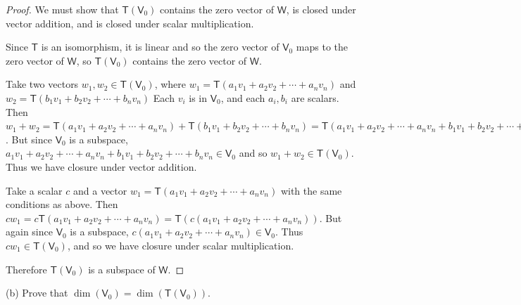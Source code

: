 \documentclass[11pt]{article}
\begin{document}
\begin{proof}
    We must show that $\mathsf{T}(\mathsf{V}_0)$ contains the zero vector of $\mathsf{W}$, is closed under vector addition, and is closed under scalar multiplication. 

    Since $\mathsf{T}$ is an isomorphism, it is linear and so the zero vector of $\mathsf{V}_0$ maps to the zero vector of $\mathsf{W}$, so $\mathsf{T}(\mathsf{V}_0)$ contains the zero vector of $\mathsf{W}$.

    Take two vectors $w_1,w_2\in \mathsf{T}(\mathsf{V}_0)$, where $w_1 = \mathsf{T}(a_1v_1+a_2v_2+\cdots + a_nv_n)$ and $w_2 = \mathsf{T}(b_1v_1+b_2v_2+\cdots + b_nv_n)$ Each $v_i$ is in $\mathsf{V}_0$, and each $a_i,b_i$ are scalars. Then $w_1+w_2 = \mathsf{T}(a_1v_1+a_2v_2+\cdots + a_nv_n) + \mathsf{T}(b_1v_1+b_2v_2+\cdots + b_nv_n) = \mathsf{T}(a_1v_1+a_2v_2+\cdots + a_nv_n + b_1v_1+b_2v_2+\cdots + b_nv_n)$. But since $\mathsf{V}_0$ is a subspace, $a_1v_1+a_2v_2+\cdots + a_nv_n + b_1v_1+b_2v_2+\cdots + b_nv_n \in \mathsf{V}_0$ and so $w_1+w_2 \in \mathsf{T}(\mathsf{V}_0)$. Thus we have closure under vector addition.

    Take a scalar $c$ and a vector $w_1 = \mathsf{T}(a_1v_1+a_2v_2+\cdots + a_nv_n)$ with the same conditions as above. Then $cw_1 = c\mathsf{T}(a_1v_1+a_2v_2+\cdots + a_nv_n) = \mathsf{T}(c(a_1v_1+a_2v_2+\cdots + a_nv_n))$. But again since $\mathsf{V}_0$ is a subspace, $c(a_1v_1+a_2v_2+\cdots + a_nv_n) \in \mathsf{V}_0$. Thus $cw_1\in\mathsf{T}(\mathsf{V}_0)$, and so we have closure under scalar multiplication.

    Therefore $\mathsf{T}(\mathsf{V}_0)$ is a subspace of $\mathsf{W}$.
\end{proof}

(b) Prove that $\dim(\mathsf{V}_0) = \dim(\mathsf{T}(\mathsf{V}_0))$.
\end{document}
